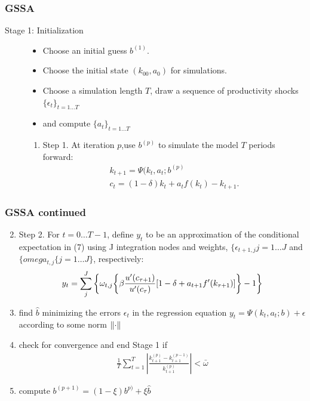 \documentclass[tikz]{beamer}
\begin{document}
 \begin{frame}
   \frametitle{GSSA}

\cite{juddGSSA2011}
 \begin{description}
\item[Stage 1: Initialization]
  \begin{itemize}
  \item  Choose an initial guess $b^{(1)}$.
 \item Choose the initial state $(k_00,a_0)$ for simulations. 
 \item  Choose a simulation length $T$, draw a sequence of 
  productivity shocks $\{\epsilon_t \}_{t=1\ldots T}$
  \item and compute $\{a_t \}_{t =1\ldots T}$
   \end{itemize}
   \begin{enumerate}
   \item 
 Step 1. At iteration $p$,use $b^(p)$ to simulate the model $T$ periods forward:
 \begin{gather}
 k_{t+1} = \Psi(k_t,a_t;b^{(p)}\\
 c_t = (1 − δ)k_t + a_tf(k_t) − k_{t+1}. 
 \end{gather}

   \end{enumerate}
 \end{description}

 \end{frame}


 \begin{frame}
   \frametitle{GSSA continued}

{\small
   \begin{enumerate}
\setcounter{enumi}{1}
 \item  Step 2. For $t = 0\ldots T − 1$, define $y_t$ to be an approximation of the conditional expectation in (7) using J integration nodes and weights, $\{\epsilon_{t+1,j}j=1\ldots J$ and $\{omega_{t,j}\{j=1\ldots J\}$, respectively:
   \begin{gather}
     y_t=\sum_j^J \left \{ \omega_{t,j}  {\left \{ \beta \frac{u^\prime(c_{\tau+1})}{u^\prime(c_{\tau})} [1- \delta + a_{t+1}f^\prime(k_{\tau+1})] \right \} -1} \right \}
   \end{gather}
 \item find $\hat{b}$ minimizing the errors $\epsilon_t$ in the regression equation $ y_{t}=\Psi(k_t,a_t;b) + \epsilon$ according to some norm $\left\lVert\cdot\right\rVert$
\item check for convergence and end Stage 1 if
  \begin{gather}
    \frac{1}{T}\sum_{t=1}^T \left | \frac{k_{t+1}^{(p)}-k_{t+1}^{(p-1)}}{k_{t+1}^{(p)}} \right | < \bar{\omega}
  \end{gather}
 \item compute $b^{(p+1)}= (1-\xi)b^{p)} + \xi \hat{b}$
   \end{enumerate}
}
 \end{frame}
\end{document}
